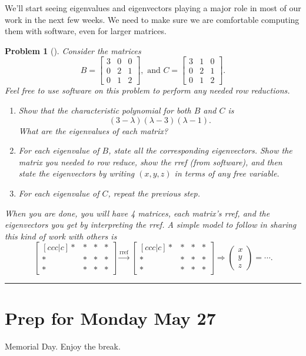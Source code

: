 \documentclass[letterpaper,oneside]{book}%
\theoremstyle{plain}
\theoremstyle{box}
\theoremstyle{problem}
\newtheorem{problemnum}{Problem}[chapter]
\newenvironment{problem}[1][]{\begin{problemnum}[#1]}{\end{problemnum}\nopagebreak\hrule\bigskip}
\newcommand{\pvec}[1]{\begin{pmatrix} #1 \end{pmatrix}}
\newcommand{\bvec}[1]{\begin{bmatrix} #1 \end{bmatrix}}
\begin{document}
We'll start seeing eigenvalues and eigenvectors playing a major role in most of our work in the next few weeks. We need to make sure we are comfortable computing them with software, even for larger matrices. 
\begin{problem}\label{First example of deficient eigenvalue}
Consider the matrices 
$$
B=
\begin{bmatrix}
 3 & 0 & 0 \\
 0 & 2 & 1 \\
 0 & 1 & 2
\end{bmatrix}
,\text{ and } 
C=
\begin{bmatrix}
 3 & 1 & 0 \\
 0 & 2 & 1 \\
 0 & 1 & 2
\end{bmatrix}
.$$
Feel free to use software on this problem to perform any needed row reductions. 
\begin{enumerate}
\item Show that the characteristic polynomial for both $B$ and $C$ is $$(3-\lambda)(\lambda-3)(\lambda -1).$$  What are the eigenvalues of each matrix?
\item For each eigenvalue of $B$, state all the corresponding eigenvectors. Show the matrix you needed to row reduce, show the rref (from software), and then state the eigenvectors by writing $(x,y,z)$ in terms of any free variable.
\item For each eigenvalue of $C$, repeat the previous step.
\end{enumerate}
When you are done, you will have 4 matrices, each matrix's rref, and the eigenvectors you get by interpreting the rref.  A simple model to follow in sharing this kind of work with others is 
$$\bvec{[ccc|c]*&*&*&*\\ *&*&*&*\\ *&*&*&*}\xrightarrow{\text{rref}} \bvec{[ccc|c]*&*&*&*\\ *&*&*&*\\ *&*&*&*} \Rightarrow \pvec{x\\y\\z}=\cdots.$$ 
\end{problem}



\section{Prep for Monday May 27}
Memorial Day.  Enjoy the break.
\end{document}
